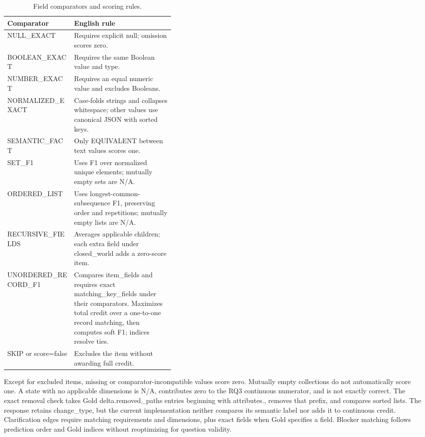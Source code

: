 \documentclass{article} %
\begin{document}
\begin{table}[htbp]
\caption{Field comparators and scoring rules.}
\label{tab:state-comparators}
\centering\normalsize
\setlength{\tabcolsep}{3pt}
\renewcommand{\arraystretch}{1.08}
\begin{tabularx}{\linewidth}{@{}>{\raggedright\arraybackslash}p{0.40\linewidth}>{\raggedright\arraybackslash}X@{}}
\toprule
Comparator & English rule \\
\midrule
NULL\_EXACT & Requires explicit null; omission scores zero. \\
BOOLEAN\_EXACT & Requires the same Boolean value and type. \\
NUMBER\_EXACT & Requires an equal numeric value and excludes Booleans. \\
NORMALIZED\_EXACT & Case-folds strings and collapses whitespace; other values use canonical JSON with sorted keys. \\
SEMANTIC\_FACT & Only EQUIVALENT between text values scores one. \\
SET\_F1 & Uses F1 over normalized unique elements; mutually empty sets are N/A. \\
ORDERED\_LIST & Uses longest-common-subsequence F1, preserving order and repetitions; mutually empty lists are N/A. \\
RECURSIVE\_FIELDS & Averages applicable children; each extra field under closed\_world adds a zero-score item. \\
UNORDERED\_RECORD\_F1 & Compares item\_fields and requires exact matching\_key\_fields under their comparators. Maximizes total credit over a one-to-one record matching, then computes soft F1; indices resolve ties. \\
SKIP or score=false & Excludes the item without awarding full credit. \\
\bottomrule
\end{tabularx}
\end{table}

Except for excluded items, missing or comparator-incompatible values score zero. Mutually empty collections do not automatically score one. A state with no applicable dimensions is N/A, contributes zero to the RQ3 continuous numerator, and is not exactly correct. The exact removal check takes Gold delta.removed\_paths entries beginning with attributes., removes that prefix, and compares sorted lists. The response retains change\_type, but the current implementation neither compares its semantic label nor adds it to continuous credit. Clarification edges require matching requirements and dimensions, plus exact fields when Gold specifies a field. Blocker matching follows prediction order and Gold indices without reoptimizing for question validity.
\end{document}
